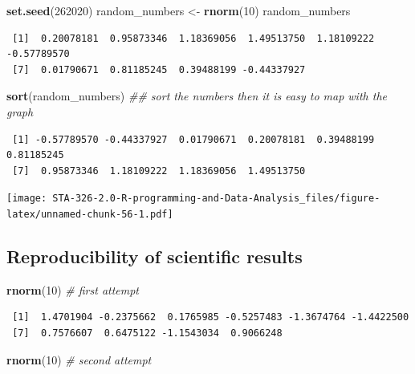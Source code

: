 \documentclass[]{book}
\newenvironment{Shaded}{\begin{snugshade}}{\end{snugshade}}
\newcommand{\CommentTok}[1]{\textcolor[rgb]{0.56,0.35,0.01}{\textit{#1}}}
\newcommand{\DecValTok}[1]{\textcolor[rgb]{0.00,0.00,0.81}{#1}}
\newcommand{\KeywordTok}[1]{\textcolor[rgb]{0.13,0.29,0.53}{\textbf{#1}}}
\newcommand{\NormalTok}[1]{#1}
\newcommand{\StringTok}[1]{\textcolor[rgb]{0.31,0.60,0.02}{#1}}
\begin{document}
\begin{Shaded}
\begin{Highlighting}[]
\KeywordTok{set.seed}\NormalTok{(}\DecValTok{262020}\NormalTok{)}
\NormalTok{random_numbers <-}\StringTok{ }\KeywordTok{rnorm}\NormalTok{(}\DecValTok{10}\NormalTok{)}
\NormalTok{random_numbers}
\end{Highlighting}
\end{Shaded}

\begin{verbatim}
 [1]  0.20078181  0.95873346  1.18369056  1.49513750  1.18109222 -0.57789570
 [7]  0.01790671  0.81185245  0.39488199 -0.44337927
\end{verbatim}

\begin{Shaded}
\begin{Highlighting}[]
\KeywordTok{sort}\NormalTok{(random_numbers) }\CommentTok{## sort the numbers then it is easy to map with the graph}
\end{Highlighting}
\end{Shaded}

\begin{verbatim}
 [1] -0.57789570 -0.44337927  0.01790671  0.20078181  0.39488199  0.81185245
 [7]  0.95873346  1.18109222  1.18369056  1.49513750
\end{verbatim}

\texttt{[image: STA-326-2.0-R-programming-and-Data-Analysis\_files/figure-latex/unnamed-chunk-56-1.pdf]}

\hypertarget{reproducibility-of-scientific-results}{%
\subsection{Reproducibility of scientific results}\label{reproducibility-of-scientific-results}}

\begin{Shaded}
\begin{Highlighting}[]
\KeywordTok{rnorm}\NormalTok{(}\DecValTok{10}\NormalTok{) }\CommentTok{# first attempt}
\end{Highlighting}
\end{Shaded}

\begin{verbatim}
 [1]  1.4701904 -0.2375662  0.1765985 -0.5257483 -1.3674764 -1.4422500
 [7]  0.7576607  0.6475122 -1.1543034  0.9066248
\end{verbatim}

\begin{Shaded}
\begin{Highlighting}[]
\KeywordTok{rnorm}\NormalTok{(}\DecValTok{10}\NormalTok{) }\CommentTok{# second attempt}
\end{Highlighting}
\end{Shaded}
\end{document}
